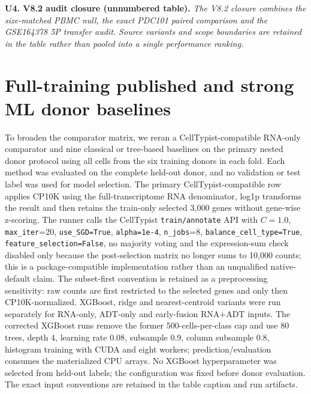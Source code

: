 \documentclass[10pt]{article}
\begin{document}
\begin{samepage}
\begin{center}
\textbf{U4. V8.2 audit closure (unnumbered table).}
\textit{The V8.2 closure combines the size-matched PBMC null, the exact PDC101 paired comparison and the GSE164378 5P transfer audit. Source variants and scope boundaries are retained in the table rather than pooled into a single performance ranking.}
\scriptsize
\setlength{\tabcolsep}{3pt}

\end{center}
\end{samepage}

\section{Full-training published and strong ML donor baselines}

To broaden the comparator matrix, we reran a CellTypist-compatible RNA-only comparator and nine classical or tree-based baselines on the primary nested donor protocol using all cells from the six training donors in each fold. Each method was evaluated on the complete held-out donor, and no validation or test label was used for model selection. The primary CellTypist-compatible row applies CP10K using the full-transcriptome RNA denominator, log1p transforms the result and then retains the train-only selected 3,000 genes without gene-wise z-scoring. The runner calls the CellTypist \texttt{train/annotate} API with $C=1.0$, \texttt{max\_iter}=20, \texttt{use\_SGD=True}, \texttt{alpha=1e-4}, \texttt{n\_jobs}=8, \texttt{balance\_cell\_type=True}, \texttt{feature\_selection=False}, no majority voting and the expression-sum check disabled only because the post-selection matrix no longer sums to 10,000 counts; this is a package-compatible implementation rather than an unqualified native-default claim. The subset-first convention is retained as a preprocessing sensitivity: raw counts are first restricted to the selected genes and only then CP10K-normalized. XGBoost, ridge and nearest-centroid variants were run separately for RNA-only, ADT-only and early-fusion RNA+ADT inputs. The corrected XGBoost runs remove the former 500-cells-per-class cap and use 80 trees, depth 4, learning rate 0.08, subsample 0.9, column subsample 0.8, histogram training with CUDA and eight workers; prediction/evaluation consumes the materialized CPU arrays. No XGBoost hyperparameter was selected from held-out labels; the configuration was fixed before donor evaluation. The exact input conventions are retained in the table caption and run artifacts.
\end{document}
